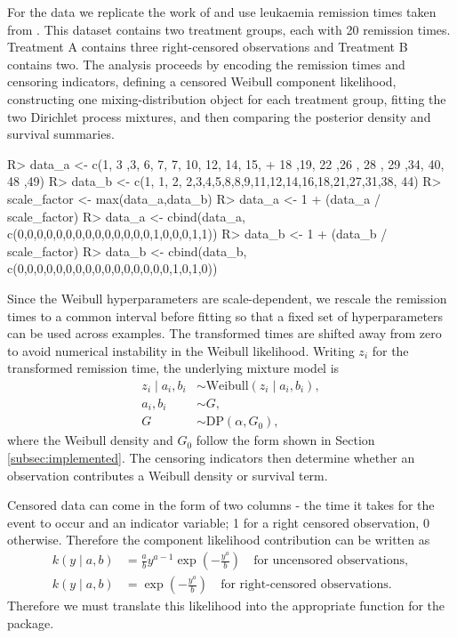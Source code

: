 \documentclass[nojss]{jss}
\begin{document}
For the data we replicate the work of \cite{kottas_nonparametric_2006} and use leukaemia remission times taken from \cite{lawless_statistical_2011}. This dataset contains two treatment groups, each with 20 remission times. Treatment A contains three right-censored observations and Treatment B contains two. The analysis proceeds by encoding the remission times and censoring indicators, defining a censored Weibull component likelihood, constructing one mixing-distribution object for each treatment group, fitting the two Dirichlet process mixtures, and then comparing the posterior density and survival summaries.

\begin{CodeInput}
R>  data_a <- c(1, 3 ,3, 6, 7, 7, 10, 12, 14, 15,
+      18 ,19, 22 ,26 , 28 , 29 ,34, 40, 48 ,49)
R>  data_b <- c(1, 1, 2, 2,3,4,5,8,8,9,11,12,14,16,18,21,27,31,38, 44)
R>  scale_factor <- max(data_a,data_b)
R>  data_a <- 1 + (data_a / scale_factor)
R>  data_a <- cbind(data_a, c(0,0,0,0,0,0,0,0,0,0,0,0,0,0,1,0,0,0,1,1))
R>  data_b <- 1 + (data_b / scale_factor)
R>  data_b <- cbind(data_b, c(0,0,0,0,0,0,0,0,0,0,0,0,0,0,0,0,1,0,1,0))
\end{CodeInput}

Since the Weibull hyperparameters are scale-dependent, we rescale the remission times to a common interval before fitting so that a fixed set of hyperparameters can be used across examples. The transformed times are shifted away from zero to avoid numerical instability in the Weibull likelihood. Writing $z_i$ for the transformed remission time, the underlying mixture model is
\begin{align*}
z_i \mid a_i , b_i & \sim \text{Weibull} ( z_i \mid a_i , b_i ), \\
a_i , b_i & \sim G, \\
G & \sim  \text{DP} (\alpha , G_0),
\end{align*}
where the Weibull density and $G_0$ follow the form shown in Section \ref{subsec:implemented}. The censoring indicators then determine whether an observation contributes a Weibull density or survival term.

Censored data can come in the form of two columns - the time it takes for the event to occur and an indicator variable; 1 for a right censored observation, 0 otherwise. Therefore the component likelihood contribution can be written as
\begin{align*}
k(y \mid a , b) & = \frac{a}{b} y ^{a-1}  \exp \left( -  \frac{y^a}{b}  \right) \quad \text{for uncensored observations}, \\
k(y \mid a , b) & =  \exp \left( -\frac{y^a}{b} \right) \quad \text{for right-censored observations}.
\end{align*}
Therefore we must translate this likelihood into the appropriate function for the  package.
\end{document}
